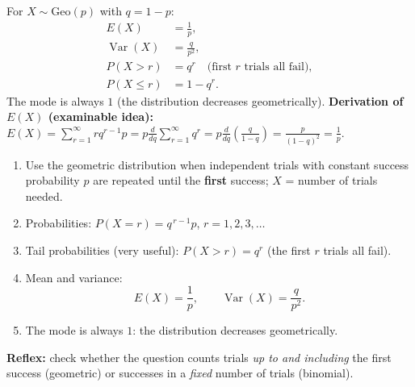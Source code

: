 \documentclass[11pt]{article}
\begin{document}
\begin{propriete}
For $X \sim \mathrm{Geo}(p)$ with $q=1-p$:
\begin{align*}
E(X) &= \frac{1}{p},\\[4pt]
\operatorname{Var}(X) &= \frac{q}{p^{2}},\\[4pt]
P(X > r) &= q^{r} \quad \text{(first $r$ trials all fail)},\\[4pt]
P(X \leq r) &= 1 - q^{r}.
\end{align*}
The mode is always $1$ (the distribution decreases geometrically).
\textbf{Derivation of $E(X)$ (examinable idea):}
$E(X) = \sum_{r=1}^{\infty} r q^{r-1}p = p \frac{d}{dq}\sum_{r=1}^{\infty} q^{r} = p \frac{d}{dq}\left(\frac{q}{1-q}\right) = \frac{p}{(1-q)^2} = \frac{1}{p}$.
\end{propriete}

\begin{methode}
\begin{enumerate}
\item Use the geometric distribution when independent trials with constant success probability $p$ are repeated until the \textbf{first} success; $X$ = number of trials needed.
\item Probabilities: $P(X = r) = q^{\,r-1} p$, $r = 1, 2, 3, \ldots$
\item Tail probabilities (very useful): $P(X > r) = q^{r}$ (the first $r$ trials all fail).
\item Mean and variance:
\[ E(X) = \frac{1}{p}, \qquad \operatorname{Var}(X) = \frac{q}{p^{2}}. \]
\item The mode is always $1$: the distribution decreases geometrically.
\end{enumerate}
\textbf{Reflex:} check whether the question counts trials \emph{up to and including} the first success (geometric) or successes in a \emph{fixed} number of trials (binomial).
\end{methode}
\end{document}
